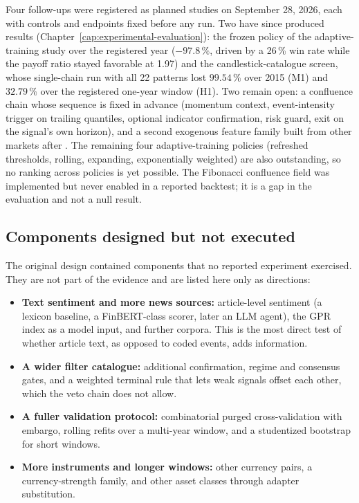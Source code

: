 Four follow-ups were registered as planned studies on September 28, 2026, each with controls and endpoints fixed before any run. Two have since produced results (Chapter~\ref{cap:experimental-evaluation}): the frozen policy of the adaptive-training study over the registered year ($-97.8\,\%$, driven by a 26\,\% win rate while the payoff ratio stayed favorable at 1.97) and the candlestick-catalogue screen, whose single-chain run with all 22 patterns lost $99.54\,\%$ over 2015 (M1) and $32.79\,\%$ over the registered one-year window (H1). Two remain open: a confluence chain whose sequence is fixed in advance (momentum context, event-intensity trigger on trailing quantiles, optional indicator confirmation, risk guard, exit on the signal's own horizon), and a second exogenous feature family built from other markets after . The remaining four adaptive-training policies (refreshed thresholds, rolling, expanding, exponentially weighted) are also outstanding, so no ranking across policies is yet possible. The Fibonacci confluence field was implemented but never enabled in a reported backtest; it is a gap in the evaluation and not a null result.

\subsection{Components designed but not executed} \label{subsec:future-unexecuted}

The original design contained components that no reported experiment exercised. They are not part of the evidence and are listed here only as directions:

\begin{itemize}
    \item \textbf{Text sentiment and more news sources:} article-level sentiment (a lexicon baseline, a FinBERT-class scorer, later an LLM agent), the GPR index as a model input, and further corpora. This is the most direct test of whether article text, as opposed to coded events, adds information.
    \item \textbf{A wider filter catalogue:} additional confirmation, regime and consensus gates, and a weighted terminal rule that lets weak signals offset each other, which the veto chain does not allow.
    \item \textbf{A fuller validation protocol:} combinatorial purged cross-validation with embargo, rolling refits over a multi-year window, and a studentized bootstrap for short windows.
    \item \textbf{More instruments and longer windows:} other currency pairs, a currency-strength family, and other asset classes through adapter substitution.
\end{itemize}
